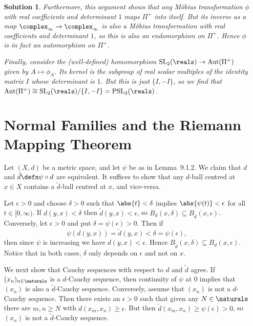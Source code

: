 \documentclass[article, a4paper, 11pt, oneside]{memoir}
\numberwithin{equation}{chapter}
\theoremstyle{nonumberplain}
\newtheorem{solution}{Solution}
\DeclareMathOperator{\Aut}{Aut}
\newcommand{\matgroup}[3]{\mathrm{#1}_{#2}(#3)}
\newcommand{\SL}[2]{\matgroup{SL}{#1}{#2}}
\newcommand{\PSL}[2]{\matgroup{PSL}{#1}{#2}}
\begin{document}
\begin{solution}
    Furthermore, this argument shows that any Möbius transformation $\phi$ with real coefficients and determinant $1$ maps $\Pi^+$ into itself. But its inverse as a map $\complex_\infty \to \complex_\infty$ is also a Möbius transformation with real coefficients and determinant $1$, so this is also an endomorphism on $\Pi^+$. Hence $\phi$ is in fact an automorphism on $\Pi^+$.

    Finally, consider the (well-defined) homomorphism $\SL{2}{\reals} \to \Aut(\Pi^+)$ given by $A \mapsto \phi_A$. Its kernel is the subgroup of real scalar multiples of the identity matrix $I$ whose determinant is $1$. But this is just $\{I,-I\}$, so we find that $\Aut(\Pi^+) \cong \SL{2}{\reals}/\{I,-I\} = \PSL{2}{\reals}$.
\end{solution}


\chapter{Normal Families and the Riemann Mapping Theorem}

\begin{remarkbreak}
    Let $(X,d)$ be a metric space, and let $\psi$ be as in Lemma~9.1.2. We claim that $d$ and $\tilde{d} \defn \psi \circ d$ are equivalent. It suffices to show that any $d$-ball centred at $x \in X$ contains a $\tilde{d}$-ball centred at $x$, and vice-versa.

    Let $\epsilon > 0$ and choose $\delta > 0$ such that $\abs{t} < \delta$ implies $\abs{\psi(t)} < \epsilon$ for all $t \in [0,\infty)$. If $d(y,x) < \delta$ then $\tilde{d}(y,x) < \epsilon$, so $B_d(x,\delta) \subseteq B_{\tilde{d}}(x,\epsilon)$. Conversely, let $\epsilon > 0$ and put $\delta = \psi(\epsilon) > 0$. Then if
    \begin{equation*}
        \psi(d(y,x))
            = \tilde{d}(y,x)
            < \delta
            = \psi(\epsilon),
    \end{equation*}
    then since $\psi$ is increasing we have $d(y,x) < \epsilon$. Hence $B_{\tilde{d}}(x,\delta) \subseteq B_d(x,\epsilon)$. Notice that in both cases, $\delta$ only depends on $\epsilon$ and not on $x$.

    We next show that Cauchy sequences with respect to $d$ and $\tilde{d}$ agree. If $(x_n)_{n \in \naturals}$ is a $d$-Cauchy sequence, then continuity of $\psi$ at $0$ implies that $(x_n)$ is also a $\tilde{d}$-Cauchy sequence. Conversely, assume that $(x_n)$ is not a $d$-Cauchy sequence. Then there exists an $\epsilon > 0$ such that given any $N \in \naturals$ there are $m,n \geq N$ with $d(x_m,x_n) \geq \epsilon$. But then $\tilde{d}(x_m,x_n) \geq \psi(\epsilon) > 0$, so $(x_n)$ is not a $\tilde{d}$-Cauchy sequence.
\end{remarkbreak}
\end{document}
